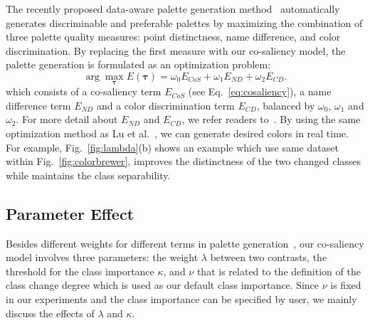 


The recently proposed data-aware palette generation method~\cite{Lu21} automatically generates discriminable and preferable palettes by maximizing the combination of three palette quality measures: point distinctness, name difference, and color discrimination.
By replacing the first measure with our co-saliency model, the palette generation is formulated as an optimization problem:
\begin{equation}
\arg\max_{\mathbf{\tau}} E(\mathbf{\tau}) = \omega_0 E_{CoS} + \omega_1 E_{ND} + \omega_2 E_{CD}.
\label{eq:energyfunc}
\end{equation}
which consists of a co-saliency term $E_{CoS}$ (see Eq.~\ref{eq:cosaliency}), a name difference term $E_{ND}$ and a color discrimination term $E_{CD}$, balanced by $\omega_0$, $\omega_1$ and $\omega_2$. For more detail about $E_{ND}$ and $E_{CD}$, we refer readers to~\cite{Lu21}. By using the same optimization method as Lu et al.~\cite{Lu21}, we can generate desired colors in real time. %
For example, Fig.~\ref{fig:lambda}(b) shows an example which use same dataset within Fig.~\ref{fig:colorbrewer}, improves the distinctness of the two changed classes while maintains the class separability.



\subsection{Parameter Effect}
\label{subsec:parameter}
Besides different weights for different terms in palette generation~\cite{Lu21}, our co-saliency model involves three parameters: the weight $\lambda$ between two contrasts, the threshold for the class importance $\kappa$, and $\nu$ that is related to the definition of the class change degree which is used as our default class importance.
Since $\nu$ is fixed in our experiments and the class importance can be specified by user, we mainly discuss the effects of $\lambda$  and $\kappa$.

